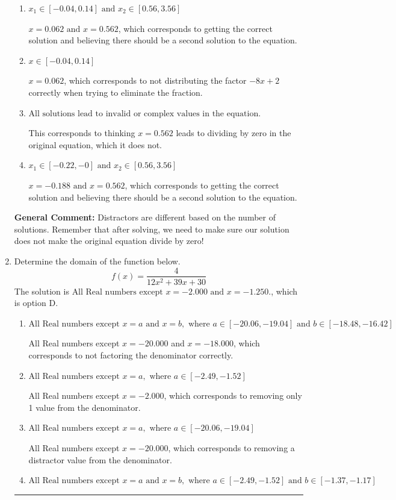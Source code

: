 \documentclass{extbook}[14pt]
\newcommand{\litem}[1]{\item #1

\rule{\textwidth}{0.4pt}}
\begin{document}
\begin{enumerate}
{\begin{enumerate}[label=\Alph*.]
* $x = 0.562$, which is the correct option.
\item \( x_1 \in [-0.04, 0.14] \text{ and } x_2 \in [0.56,3.56] \)

$x = 0.062 \text{ and } x = 0.562$, which corresponds to getting the correct solution and believing there should be a second solution to the equation.
\item \( x \in [-0.04,0.14] \)

$x = 0.062$, which corresponds to not distributing the factor $-8x + 2$ correctly when trying to eliminate the fraction.
\item \( \text{All solutions lead to invalid or complex values in the equation.} \)

This corresponds to thinking $x = 0.562$ leads to dividing by zero in the original equation, which it does not.
\item \( x_1 \in [-0.22, -0] \text{ and } x_2 \in [0.56,3.56] \)

$x = -0.188 \text{ and } x = 0.562$, which corresponds to getting the correct solution and believing there should be a second solution to the equation.
\end{enumerate}

\textbf{General Comment:} Distractors are different based on the number of solutions. Remember that after solving, we need to make sure our solution does not make the original equation divide by zero!
}
\litem{
Determine the domain of the function below.
\[ f(x) = \frac{4}{12x^{2} +39 x + 30} \]The solution is \( \text{All Real numbers except } x = -2.000 \text{ and } x = -1.250. \), which is option D.\begin{enumerate}[label=\Alph*.]
\item \( \text{All Real numbers except } x = a \text{ and } x = b, \text{ where } a \in [-20.06, -19.04] \text{ and } b \in [-18.48, -16.42] \)

All Real numbers except $x = -20.000$ and $x = -18.000$, which corresponds to not factoring the denominator correctly.
\item \( \text{All Real numbers except } x = a, \text{ where } a \in [-2.49, -1.52] \)

All Real numbers except $x = -2.000$, which corresponds to removing only 1 value from the denominator.
\item \( \text{All Real numbers except } x = a, \text{ where } a \in [-20.06, -19.04] \)

All Real numbers except $x = -20.000$, which corresponds to removing a distractor value from the denominator.
\item \( \text{All Real numbers except } x = a \text{ and } x = b, \text{ where } a \in [-2.49, -1.52] \text{ and } b \in [-1.37, -1.17] \)


\end{enumerate}}
\end{enumerate}
\end{document}
